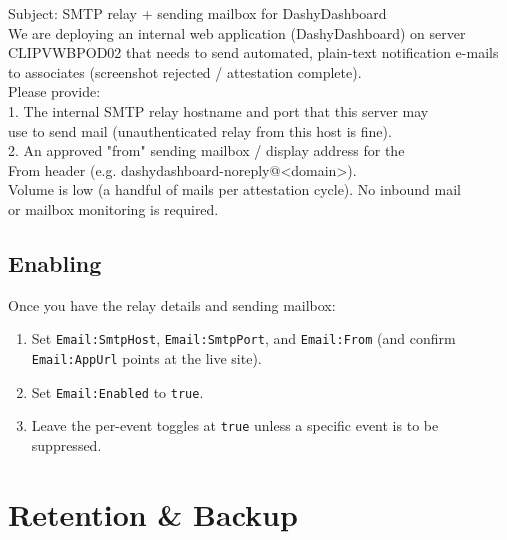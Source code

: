 \documentclass[12pt,a4paper]{report}
\begin{document}
\begin{codebox}
\ttfamily\small
Subject: SMTP relay + sending mailbox for DashyDashboard\\[4pt]
We are deploying an internal web application (DashyDashboard) on server\\
CLIPVWBPOD02 that needs to send automated, plain-text notification e-mails\\
to associates (screenshot rejected / attestation complete).\\[4pt]
Please provide:\\
\hspace*{1em}1. The internal SMTP relay hostname and port that this server may\\
\hspace*{3em}use to send mail (unauthenticated relay from this host is fine).\\
\hspace*{1em}2. An approved "from" sending mailbox / display address for the\\
\hspace*{3em}From header (e.g. dashydashboard-noreply@<domain>).\\[4pt]
Volume is low (a handful of mails per attestation cycle). No inbound mail\\
or mailbox monitoring is required.
\end{codebox}

\section{Enabling}

Once you have the relay details and sending mailbox:

\begin{enumerate}
  \item Set \texttt{Email:SmtpHost}, \texttt{Email:SmtpPort}, and \texttt{Email:From} (and confirm
        \texttt{Email:AppUrl} points at the live site).
  \item Set \texttt{Email:Enabled} to \texttt{true}.
  \item Leave the per-event toggles at \texttt{true} unless a specific event is to be suppressed.
\end{enumerate}

\chapter{Retention \& Backup}
\label{ch:retention}
\end{document}
